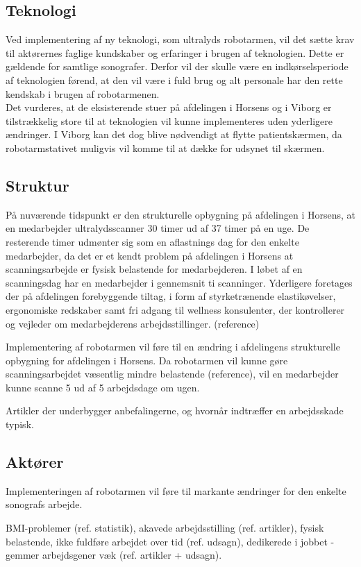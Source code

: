 \subsection{Teknologi}
Ved implementering af ny teknologi, som ultralyds robotarmen, vil det sætte krav til aktørernes faglige kundskaber og erfaringer i brugen af teknologien. Dette er gældende for samtlige sonografer. Derfor vil der skulle være en indkørselsperiode af teknologien førend, at den vil være i fuld brug og alt personale har den rette kendskab i brugen af robotarmenen. \\
Det vurderes, at de eksisterende stuer på afdelingen i Horsens og i Viborg er tilstrækkelig store til at teknologien vil kunne implementeres uden yderligere ændringer. I Viborg kan det dog blive nødvendigt at flytte patientskærmen, da robotarmstativet muligvis vil komme til at dække for udsynet til skærmen.  

\subsection{Struktur}
På nuværende tidspunkt er den strukturelle opbygning på afdelingen i Horsens, at en medarbejder ultralydsscanner 30 timer ud af 37 timer på en uge. De resterende timer udmønter sig som en aflastnings dag for den enkelte medarbejder, da det er et kendt problem på afdelingen i Horsens at scanningsarbejde er fysisk belastende for medarbejderen. I løbet af en scanningsdag har en medarbejder i gennemsnit ti scanninger. Yderligere foretages der på afdelingen forebyggende tiltag, i form af styrketrænende elastikøvelser, ergonomiske redskaber samt fri adgang til wellness konsulenter, der kontrollerer og vejleder om medarbejderens arbejdsstillinger. (reference)

Implementering af robotarmen vil føre til en ændring i afdelingens strukturelle opbygning for afdelingen i Horsens. Da robotarmen vil kunne gøre scanningsarbejdet væsentlig mindre belastende (reference), vil en medarbejder kunne scanne 5 ud af 5 arbejdsdage om ugen.  

Artikler der underbygger anbefalingerne, og hvornår indtræffer en arbejdsskade typisk. 

\subsection{Aktører}
Implementeringen af robotarmen vil føre til markante ændringer for den enkelte sonografs arbejde.

BMI-problemer (ref. statistik), akavede arbejdsstilling (ref. artikler), fysisk belastende, ikke fuldføre arbejdet over tid (ref. udsagn), dedikerede i jobbet - gemmer arbejdsgener væk (ref. artikler + udsagn).

